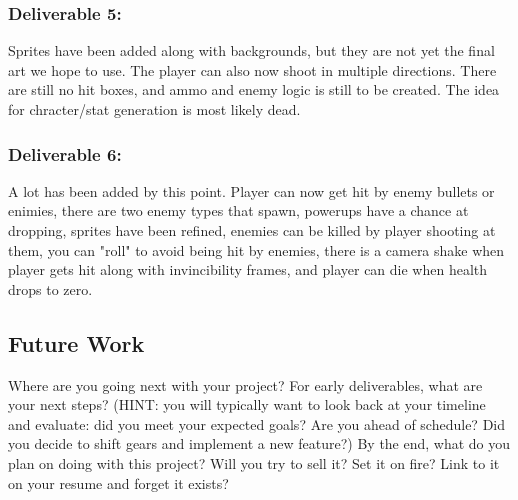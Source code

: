 \documentclass[10pt,conference,onecolumn,compsoc]{IEEEtran}
\begin{document}
\subsubsection*{Deliverable 5:} Sprites have been added along with 
backgrounds, but they 
are not yet the final art we hope to use. The player can also now
shoot in multiple directions. There are still no hit boxes, and ammo and 
enemy logic is still to be created. The idea for chracter/stat
generation is most likely dead.

\subsubsection*{Deliverable 6:}A lot has been added by this point. Player 
can now get hit by 
enemy bullets or enimies, there are two enemy types that 
spawn, powerups have a chance at dropping, sprites have been refined, 
enemies can be killed by player shooting at them, you can "roll"
to avoid being hit by enemies, there is a camera shake when player gets hit 
along with invincibility frames, and player can die when
health drops to zero.

\subsection{Future Work}
Where are you going next with your project?
For early deliverables, what are your next steps?  (HINT: you will typically want to look back at your timeline and evaluate: did you meet your expected goals?  Are you ahead of schedule?  Did you decide to shift gears and implement a new feature?)
By the end, what do you plan on doing with this project?  Will you try to sell it?  Set it on fire?  Link to it on your resume and forget it exists?




%
%
%
%
\end{document}
